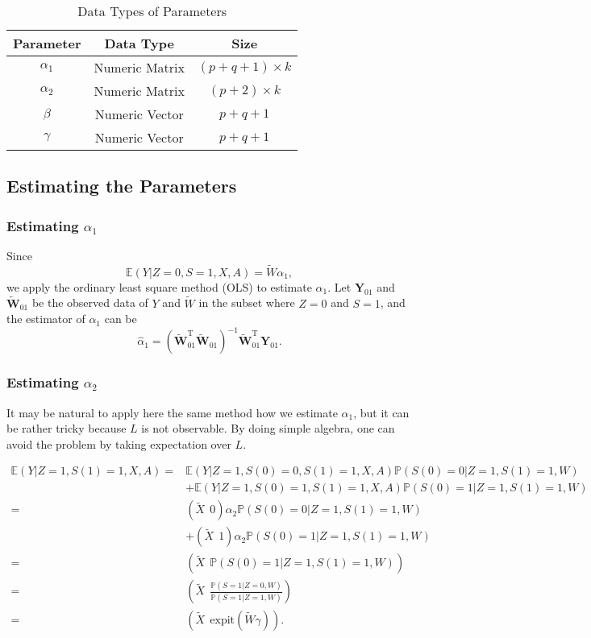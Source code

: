 \documentclass[article]{jss}
\def\expit{\mathrm{expit}}
\newcommand{\transpose}[1]{#1^{\mathrm{T}}}
\begin{document}
\begin{table}[!htbp]
  \centering
  \begin{tabular}{ccc}
    \toprule
    Parameter & Data Type & Size \\
    \midrule
    $\alpha_1$ & Numeric Matrix & $(p+q+1)\times k$ \\
    $\alpha_2$ & Numeric Matrix & $(p+2)\times k$ \\
    $\beta$ & Numeric Vector & $p+q+1$\\
    $\gamma$ & Numeric Vector & $p+q+1$\\
    \bottomrule
  \end{tabular}
  \label{tbl::data}
  \caption{Data Types of Parameters}
\end{table}

\subsection{Estimating the Parameters}
\subsubsection{Estimating $\alpha_1$}
Since $$\mathbb{E}(Y|Z=0,S=1,X,A)=\widetilde{W}\alpha_1,$$ we apply the ordinary least square method (OLS) to estimate $\alpha_1$. Let $\mathbf{Y}_{01}$ and $\widetilde{\mathbf{W}}_{01}$ be the observed data of $Y$ and $\widetilde{W}$ in the subset where $Z=0$ and $S=1$, and the estimator of $\alpha_1$ can be
%
\begin{equation}
\widehat{\alpha}_1=(\transpose{\widetilde{\mathbf{W}}_{01}}\widetilde{\mathbf{W}}_{01})^{-1}\transpose{\widetilde{\mathbf{W}}_{01}}\mathbf{Y}_{01}.
\end{equation}
%

\subsubsection{Estimating $\alpha_2$}
It may be natural to apply here the same method how we estimate $\alpha_1$, but it can be rather tricky because $L$ is not observable.
By doing simple algebra, one can avoid the problem by taking expectation over $L$.

\begin{equation}
  \begin{aligned}
    \mathbb{E}(Y|Z=1,S(1)=1,X,A)=&\mathbb{E}(Y|Z=1,S(0)=0,S(1)=1,X,A)
    \mathbb{P}(S(0)=0|Z=1,S(1)=1,W)\\
    &+\mathbb{E}(Y|Z=1,S(0)=1,S(1)=1,X,A)\mathbb{P}(S(0)=1|Z=1,S(1)=1,W)\\
    =&(\widetilde{X}~~0)\alpha_2\mathbb{P}(S(0)=0|Z=1,S(1)=1,W)\\
    &+(\widetilde{X}~~1)\alpha_2\mathbb{P}(S(0)=1|Z=1,S(1)=1,W)\\
    =&(\widetilde{X}~~\mathbb{P}(S(0)=1|Z=1,S(1)=1,W))\\
    =&\left(\widetilde{X}~~\frac{\mathbb{P}(S=1|Z=0,W)}{\mathbb{P}(S=1|Z=1,W)}\right) \\
    =&\left(\widetilde{X}~~\expit(\widetilde{W}\gamma)\right).
  \end{aligned}
\end{equation}
\end{document}
